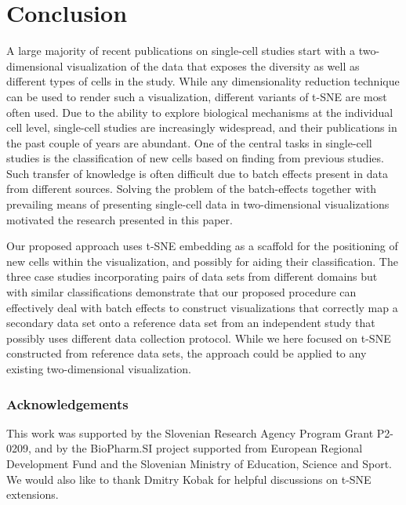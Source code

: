 \documentclass[runningheads]{llncs}
\begin{document}
\section{Conclusion}

A large majority of recent publications on single-cell studies start with a
two-dimensional visualization of the data that exposes the diversity as well as
different types of cells in the study. While any dimensionality reduction
technique can be used to render such a visualization, different variants of
t-SNE are most often used. Due to the ability to explore biological mechanisms
at the individual cell level, single-cell studies are increasingly widespread, and
their publications in the past couple of years are abundant. One of the central
tasks in single-cell studies is the classification of new cells based on
finding from previous studies. Such transfer of knowledge is often difficult
due to batch effects present in data from different sources. Solving the
problem of the batch-effects together with prevailing means of presenting
single-cell data in two-dimensional visualizations motivated the research
presented in this paper. 

Our proposed approach uses t-SNE embedding as a scaffold for the positioning of
new cells within the visualization, and possibly for aiding their
classification. The three case studies incorporating pairs of data sets from
different domains but with similar classifications demonstrate that our
proposed procedure can effectively deal with batch effects to construct
visualizations that correctly map a secondary data set onto a reference data
set from an independent study that possibly uses different data collection
protocol. While we here focused on t-SNE constructed from reference data sets,
the approach could be applied to any existing two-dimensional visualization.

\subsubsection*{Acknowledgements}

This work was supported by the Slovenian Research Agency Program Grant P2-0209,
and by the BioPharm.SI project supported from European Regional Development
Fund and the Slovenian Ministry of Education, Science and Sport. We would also
like to thank Dmitry Kobak for helpful discussions on t-SNE extensions.



\end{document}
